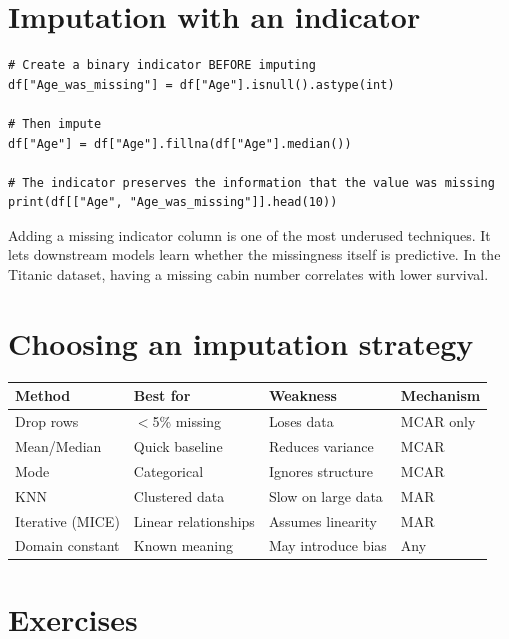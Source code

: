 \section{Imputation with an indicator}

\begin{verbatim}
# Create a binary indicator BEFORE imputing
df["Age_was_missing"] = df["Age"].isnull().astype(int)

# Then impute
df["Age"] = df["Age"].fillna(df["Age"].median())

# The indicator preserves the information that the value was missing
print(df[["Age", "Age_was_missing"]].head(10))
\end{verbatim}

\begin{datatip}
Adding a missing indicator column is one of the most underused techniques. It lets downstream models learn whether the missingness itself is predictive. In the Titanic dataset, having a missing cabin number correlates with lower survival.
\end{datatip}

\section{Choosing an imputation strategy}

\begin{longtable}{p{3.5cm}p{3cm}p{3cm}p{3.5cm}}
\toprule
\textbf{Method} & \textbf{Best for} & \textbf{Weakness} & \textbf{Mechanism} \\
\midrule
Drop rows & $<$5\% missing & Loses data & MCAR only \\
Mean/Median & Quick baseline & Reduces variance & MCAR \\
Mode & Categorical & Ignores structure & MCAR \\
KNN & Clustered data & Slow on large data & MAR \\
Iterative (MICE) & Linear relationships & Assumes linearity & MAR \\
Domain constant & Known meaning & May introduce bias & Any \\
\bottomrule
\end{longtable}

\section{Exercises}

